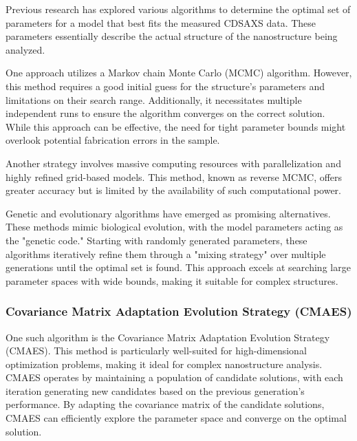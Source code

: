 \medskip

Previous research has explored various algorithms to determine the optimal set of parameters for a model that best fits the measured CDSAXS data. These parameters essentially describe the actual structure of the nanostructure being analyzed.

\medskip

One approach utilizes a Markov chain Monte Carlo (MCMC) algorithm. However, this method requires a good initial guess for the structure's parameters and limitations on their search range. Additionally, it necessitates multiple independent runs to ensure the algorithm converges on the correct solution. While this approach can be effective, the need for tight parameter bounds might overlook potential fabrication errors in the sample.

\medskip

Another strategy involves massive computing resources with parallelization and highly refined grid-based models. This method, known as reverse MCMC, offers greater accuracy but is limited by the availability of such computational power.

\medskip

Genetic and evolutionary algorithms have emerged as promising alternatives. These methods mimic biological evolution, with the model parameters acting as the "genetic code." Starting with randomly generated parameters, these algorithms iteratively refine them through a "mixing strategy" over multiple generations until the optimal set is found. This approach excels at searching large parameter spaces with wide bounds, making it suitable for complex structures.
\cite{hannon2016advancing}
\subsubsection{Covariance Matrix Adaptation Evolution Strategy (CMAES)}

One such algorithm is the Covariance Matrix Adaptation Evolution Strategy (CMAES). This method is particularly well-suited for high-dimensional optimization problems, making it ideal for complex nanostructure analysis. CMAES operates by maintaining a population of candidate solutions, with each iteration generating new candidates based on the previous generation's performance. By adapting the covariance matrix of the candidate solutions, CMAES can efficiently explore the parameter space and converge on the optimal solution.

